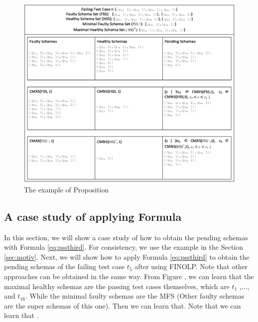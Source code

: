 {\begin{figure}[ht]
 \centering
 \includegraphics[width=5.6in]{minmax.eps}
 \caption{The example of Proposition }
 \label{fig_minmax}
\end{figure}


%
%

\subsection{A case study of applying Formula }
In this section, we will show a case study of how to obtain the pending schemas with Formula \ref{eq:pssthird}. For consistency, we use the example in the Section \ref{sec:motiv}. Next, we will show how to  apply Formula \ref{eq:pssthird} to obtain the pending schemas of the failing test case $t_{5}$ after using FINOLP. Note that other approaches can be obtained in the same way.
From Figure , we can learn that the maximal healthy schemas are the passing test cases themselves, which are $t_{1}$ ,..., and $t_{16}$. While the minimal faulty schemas are the MFS  (Other faulty schemas are the super schemas of this one).
Then we can learn that.  Note that we can learn that .

}
